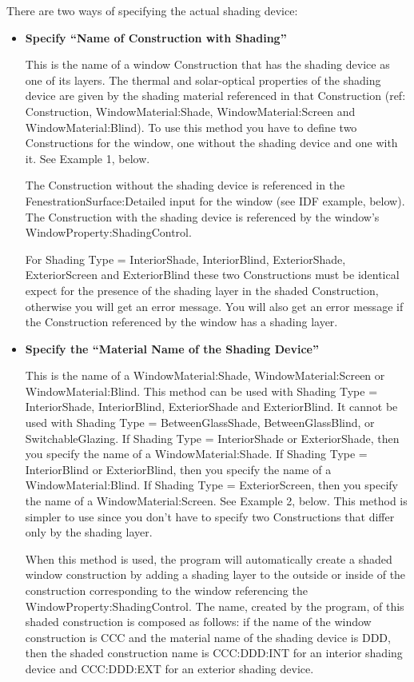 There are two ways of specifying the actual shading device:

\begin{itemize}
  \item
\textbf{Specify ``Name of Construction with Shading''}

This is the name of a window Construction that has the shading device as one of its layers. The thermal and solar-optical properties of the shading device are given by the shading material referenced in that Construction (ref: Construction, WindowMaterial:Shade, WindowMaterial:Screen and WindowMaterial:Blind). To use this method you have to define two Constructions for the window, one without the shading device and one with it. See Example 1, below.

The Construction without the shading device is referenced in the FenestrationSurface:Detailed input for the window (see IDF example, below). The Construction with the shading device is referenced by the window's WindowProperty:ShadingControl.

For Shading Type = InteriorShade, InteriorBlind, ExteriorShade, ExteriorScreen and ExteriorBlind these two Constructions must be identical expect for the presence of the shading layer in the shaded Construction, otherwise you will get an error message. You will also get an error message if the Construction referenced by the window has a shading layer.

  \item
\textbf{Specify the ``Material Name of the Shading Device''}

This is the name of a WindowMaterial:Shade, WindowMaterial:Screen or WindowMaterial:Blind. This method can be used with Shading Type = InteriorShade, InteriorBlind, ExteriorShade and ExteriorBlind. It cannot be used with Shading Type = BetweenGlassShade, BetweenGlassBlind, or SwitchableGlazing. If Shading Type = InteriorShade or ExteriorShade, then you specify the name of a WindowMaterial:Shade. If Shading Type = InteriorBlind or ExteriorBlind, then you specify the name of a WindowMaterial:Blind. If Shading Type = ExteriorScreen, then you specify the name of a WindowMaterial:Screen. See Example 2, below. This method is simpler to use since you don't have to specify two Constructions that differ only by the shading layer.

When this method is used, the program will automatically create a shaded window construction by adding a shading layer to the outside or inside of the construction corresponding to the window referencing the WindowProperty:ShadingControl. The name, created by the program, of this shaded construction is composed as follows: if the name of the window construction is CCC and the material name of the shading device is DDD, then the shaded construction name is CCC:DDD:INT for an interior shading device and CCC:DDD:EXT for an exterior shading device.


\end{itemize}
